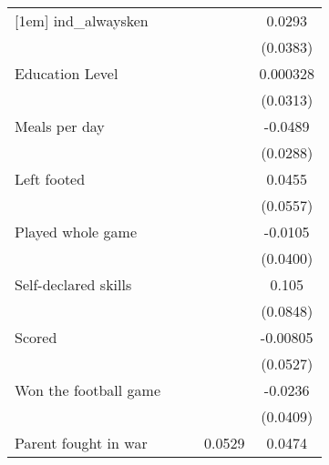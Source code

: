 {\begin{tabular}{l*{4}{c}}
[1em]
ind\_alwaysken       &                     &                     &                     &      0.0293         \\
                    &                     &                     &                     &    (0.0383)         \\
[1em]
Education Level     &                     &                     &                     &    0.000328         \\
                    &                     &                     &                     &    (0.0313)         \\
[1em]
Meals per day       &                     &                     &                     &     -0.0489\sym{*}  \\
                    &                     &                     &                     &    (0.0288)         \\
[1em]
Left footed         &                     &                     &                     &      0.0455         \\
                    &                     &                     &                     &    (0.0557)         \\
[1em]
Played whole game   &                     &                     &                     &     -0.0105         \\
                    &                     &                     &                     &    (0.0400)         \\
[1em]
Self-declared skills&                     &                     &                     &       0.105         \\
                    &                     &                     &                     &    (0.0848)         \\
[1em]
Scored              &                     &                     &                     &    -0.00805         \\
                    &                     &                     &                     &    (0.0527)         \\
[1em]
Won the football game&                     &                     &                     &     -0.0236         \\
                    &                     &                     &                     &    (0.0409)         \\
[1em]
Parent fought in war&                     &                     &      0.0529         &      0.0474         \\

\end{tabular}}
